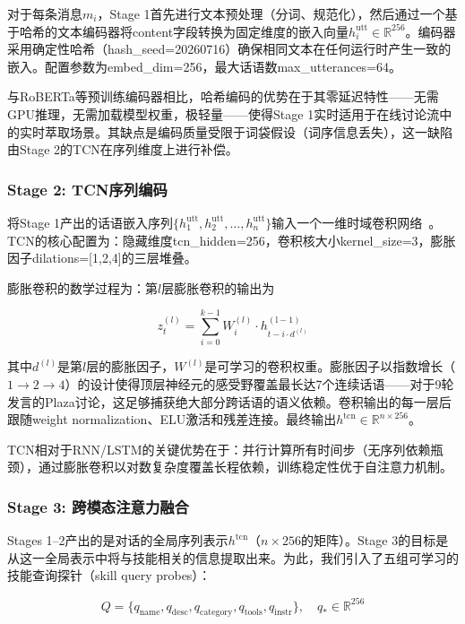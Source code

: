 \documentclass[conference]{IEEEtran}
\begin{document}
对于每条消息$m_i$，Stage 1首先进行文本预处理（分词、规范化），然后通过一个基于哈希的文本编码器将content字段转换为固定维度的嵌入向量$h_i^{\mathrm{utt}} \in \mathbb{R}^{256}$。编码器采用确定性哈希（hash\_seed=20260716）确保相同文本在任何运行时产生一致的嵌入。配置参数为embed\_dim=256，最大话语数max\_utterances=64。

与RoBERTa等预训练编码器相比，哈希编码的优势在于其零延迟特性——无需GPU推理，无需加载模型权重，极轻量——使得Stage 1实时适用于在线讨论流中的实时萃取场景。其缺点是编码质量受限于词袋假设（词序信息丢失），这一缺陷由Stage 2的TCN在序列维度上进行补偿。

\subsubsection{Stage 2: TCN序列编码}

将Stage 1产出的话语嵌入序列$\{h_1^{\mathrm{utt}}, h_2^{\mathrm{utt}}, \ldots, h_n^{\mathrm{utt}}\}$输入一个一维时域卷积网络~\cite{bai2018tcn}。TCN的核心配置为：隐藏维度tcn\_hidden=256，卷积核大小kernel\_size=3，膨胀因子dilations=[1,2,4]的三层堆叠。

膨胀卷积的数学过程为：第$l$层膨胀卷积的输出为

\begin{equation}
z^{(l)}_t = \sum_{i=0}^{k-1} W^{(l)}_i \cdot h^{\mathrm{(l-1)}}_{t - i \cdot d^{(l)}}
\label{eq:tcn_dilated}
\end{equation}

其中$d^{(l)}$是第$l$层的膨胀因子，$W^{(l)}$是可学习的卷积权重。膨胀因子以指数增长（$1 \to 2 \to 4$）的设计使得顶层神经元的感受野覆盖最长达7个连续话语——对于9轮发言的Plaza讨论，这足够捕获绝大部分跨话语的语义依赖。卷积输出的每一层后跟随weight normalization、ELU激活和残差连接。最终输出$h^{\mathrm{tcn}} \in \mathbb{R}^{n \times 256}$。

TCN相对于RNN/LSTM的关键优势在于：并行计算所有时间步（无序列依赖瓶颈），通过膨胀卷积以对数复杂度覆盖长程依赖，训练稳定性优于自注意力机制。

\subsubsection{Stage 3: 跨模态注意力融合}

Stages 1--2产出的是对话的全局序列表示$h^{\mathrm{tcn}}$（$n \times 256$的矩阵）。Stage 3的目标是从这一全局表示中将与技能相关的信息提取出来。为此，我们引入了五组可学习的技能查询探针（skill query probes）：

\begin{equation}
Q = \{q_{\mathrm{name}}, q_{\mathrm{desc}}, q_{\mathrm{category}}, q_{\mathrm{tools}}, q_{\mathrm{instr}}\}, \quad q_* \in \mathbb{R}^{256}
\label{eq:skill_probes}
\end{equation}
\end{document}
